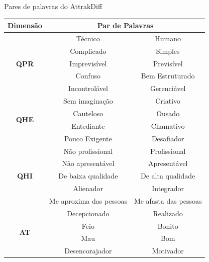 \begin{quadro}
\caption{\label{qAttrakDiff}Pares de palavras do AttrakDiff}

\begin{tabular}{|c|cc|}
\hline
\textbf{Dimensão}             & \multicolumn{2}{c|}{\textbf{Par de Palavras}}                        \\ \hline
\multirow{5}{*}{\textbf{QPR}} & \multicolumn{1}{c|}{Técnico}                 & Humano                \\ \cline{2-3} 
                              & \multicolumn{1}{c|}{Complicado}              & Simples               \\ \cline{2-3} 
                              & \multicolumn{1}{c|}{Imprevisível}            & Previsível            \\ \cline{2-3} 
                              & \multicolumn{1}{c|}{Confuso}                 & Bem Estruturado       \\ \cline{2-3} 
                              & \multicolumn{1}{c|}{Incontrolável}           & Gerenciável           \\ \hline
\multirow{4}{*}{\textbf{QHE}} & \multicolumn{1}{c|}{Sem imaginação}          & Criativo              \\ \cline{2-3} 
                              & \multicolumn{1}{c|}{Cauteloso}               & Ousado                \\ \cline{2-3} 
                              & \multicolumn{1}{c|}{Entediante}              & Chamativo             \\ \cline{2-3} 
                              & \multicolumn{1}{c|}{Pouco Exigente}          & Desafiador            \\ \hline
\multirow{5}{*}{\textbf{QHI}} & \multicolumn{1}{c|}{Não profissional}        & Profissional          \\ \cline{2-3} 
                              & \multicolumn{1}{c|}{Não apresentável}        & Apresentável          \\ \cline{2-3} 
                              & \multicolumn{1}{c|}{De baixa qualidade}      & De alta qualidade     \\ \cline{2-3} 
                              & \multicolumn{1}{c|}{Alienador}               & Integrador            \\ \cline{2-3} 
                              & \multicolumn{1}{c|}{Me aproxima das pessoas} & Me afasta das pessoas \\ \hline
\multirow{4}{*}{\textbf{AT}} & \multicolumn{1}{c|}{Decepcionado}            & Realizado             \\ \cline{2-3} 
                              & \multicolumn{1}{c|}{Feio}                    & Bonito                \\ \cline{2-3} 
                              & \multicolumn{1}{c|}{Mau}                     & Bom                   \\ \cline{2-3} 
                              & \multicolumn{1}{c|}{Desencorajador}          & Motivador             \\ \hline
\end{tabular}
\end{quadro} 

